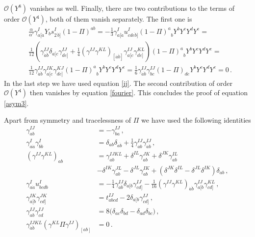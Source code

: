\documentclass[12pt]{article}
\def\da{\dot{a}}
\def\db{\dot{b}}
\def\a{\alpha}
\def\g{\gamma}
\def\d{\delta}
\def\mc{\mathcal}
\numberwithin{equation}{section} \setlength{\textwidth}{17cm}
\begin{document}
${\mc O}(Y^8)$ vanishes as well. Finally, there are two
contributions to the terms of order ${\mc O}(Y^4)$, both of them
vanish separately. The first one is
\begin{align}
&\frac{\a}{\a'}\g^I_{a[\da}Y_bs_{2\,\db]}^I(1-\Pi)^{ab}=
-\frac{1}{3}\g^I_{a[\da}u^I_{cde\db]}{(1-\Pi)^a}_bY^bY^cY^dY^e=\nonumber\\
&\frac{1}{12}\left(\g^{IJ}_{\da\db}\d_{a[c}\g^{IJ}_{de]}
+\frac{1}{4}\left(\g^{IJ}\g^{KL}\right)_{[\da\db]}\g^{IJ}_{a[c}\g^{KL}_{de]}\right)
{(1-\Pi)^a}_bY^bY^cY^dY^e=\nonumber\\
&\frac{1}{12}\g^{IJ}_{\da\db}\g^{IK}_{a[c}\g^{KJ}_{de]}{(1-\Pi)^a}_bY^bY^cY^dY^e=
\frac{1}{6}\g^{IJ}_{\da\db}\g^{IJ}_{bc}(1-\Pi)_{de}Y^bY^cY^dY^e=0\,.
\end{align}
In the last step we have used equation \eqref{ij}. The second
contribution of order ${\mc O}(Y^4)$ then vanishes by equation
\eqref{fourier}. This concludes the proof of equation
\eqref{asym3}.

\noindent Apart from symmetry and tracelessness of $\Pi$ we have
used the following identities
\begin{align}
\g^{IJ}_{ab}&=-\g^{IJ}_{ba}\,,\\
\g^I_{a\da}\g^I_{b\db}&=\d_{ab}\d_{\da\db}+\frac{1}{4}\g^{IJ}_{ab}\g^{IJ}_{\da\db}\,,\\
\left(\g^{IJ}\g^{KL}\right)_{ab}&=\g^{IJKL}_{ab}+\d^{IL}\g^{JK}_{ab}+\d^{JK}\g^{IL}_{ab}
\nonumber \\
&-\d^{IK}\g^{JL}_{ab}-\d^{JL}\g^{IK}_{ab}+\left(\d^{JK}\d^{IL}-\d^{JL}\d^{IK}\right)\d_{ab}
\,,\\
\label{gu}
\g^I_{a\da}u^I_{bcd\db}&=-\frac{1}{4}\g^{IJ}_{\da\db}\d_{a[b}\g^{IJ}_{cd]}
-\frac{1}{16}\left(\g^{IJ}\g^{KL}\right)_{\da\db}\g^{IJ}_{a[b}\g^{KL}_{cd]}\,,\\
\label{ij}
\g^{IK}_{a[b}\g^{JK}_{cd]} & =t^{IJ}_{abcd}-2\d_{a[b}\g^{IJ}_{cd]}\,,\\
\label{ijij}
\g^{IJ}_{ab}\g^{IJ}_{cd} & = 8\bigl(\d_{ac}\d_{bd}-\d_{ad}\d_{bc}\bigr)\,,\\
\label{klpij}
\gamma^{IJKL}_{\da\db}\left(\g^{KL}\Pi\g^{IJ}\right)_{[ab]}&=0 \,.
\end{align}
\end{document}
